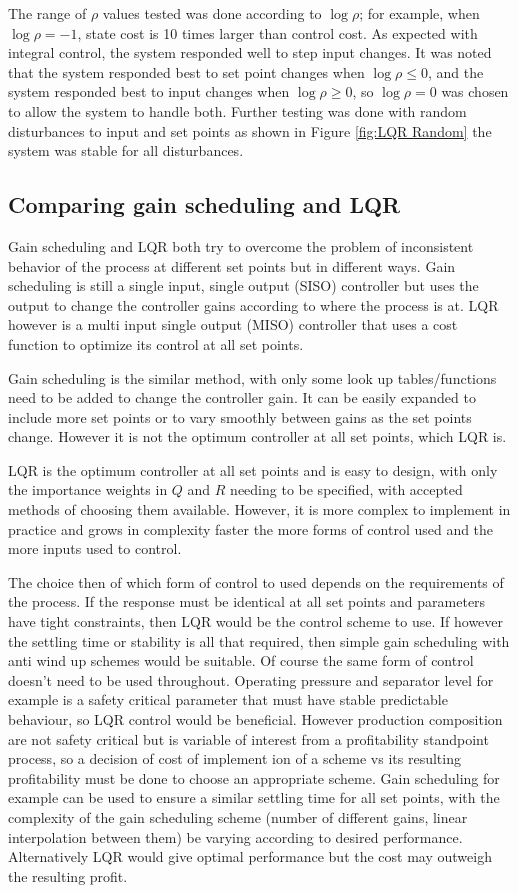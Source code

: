 \documentclass[11pt]{article}
\begin{document}
The range of $\rho$ values tested was done according to $\log \rho$; for example, when $\log \rho = −1$, state
cost is 10 times larger than control cost. As expected with integral control, the system responded
well to step input changes. It was noted that the system responded best to set point changes when
$\log \rho \leq 0$, and the system responded best to input changes when $\log \rho \geq 0$, so $\log \rho = 0$ was chosen to allow the system to handle both. Further testing was done with random disturbances to input
and set points as shown in Figure \ref{fig:LQR Random} the system was stable for all disturbances.

\subsection{Comparing gain scheduling and LQR}
Gain scheduling and LQR both try to overcome the problem of inconsistent behavior of the process at different set points but in different ways. Gain scheduling is still a single input, single output (SISO) controller but uses the output to change the controller gains according to where the process is at. LQR however is a multi input single output (MISO) controller that uses a cost function to optimize its control at all set points. 

Gain scheduling is the similar method, with only some look up tables/functions need to be added to change the controller gain. It can be easily expanded to include more set points or to vary smoothly between gains as the set points change. However it is not the optimum controller at all set points, which LQR is.

LQR is the optimum controller at all set points and is easy to design, with only the importance weights in $Q$ and $R$ needing to be specified, with accepted methods of choosing them available. However, it is more complex to implement in practice and grows in complexity faster the more forms of control used and the more inputs used to control. 

The choice then of which form of control to used depends on the requirements of the process. If the response must be identical at all set points and parameters have tight constraints, then LQR would be the control scheme to use. If however the settling time or stability is all that required, then simple gain scheduling with anti wind up schemes would be suitable. Of course the same form of control doesn't need to be used throughout. Operating pressure and separator level for example is a safety critical parameter that must have stable predictable behaviour, so LQR control would be beneficial. However production composition are not safety critical but is variable of interest from a profitability standpoint process, so a decision of cost of implement ion of a scheme vs its resulting profitability must be done to choose an appropriate scheme. Gain scheduling for example can be used to ensure a similar settling time for all set points, with the complexity of the gain scheduling scheme (number of different gains, linear interpolation between them) be varying according to desired performance. Alternatively LQR would give optimal performance but the cost may outweigh the resulting profit.
\end{document}
